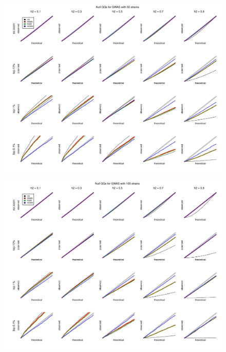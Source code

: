 \begin{figure}
  \includegraphics[width = \textwidth]{images/2018-05-19alt_heterosked_sims_nstrain=50_nsnps=100_nsims=10000.pdf}
\end{figure}

\begin{figure}
  \includegraphics[width = \textwidth]{images/2018-05-19alt_heterosked_sims_nstrain=100_nsnps=100_nsims=10000.pdf}
\end{figure}

